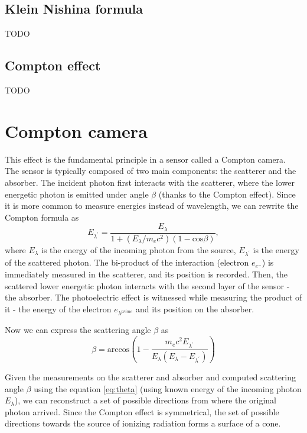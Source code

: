 \subsection{Klein Nishina formula}
TODO

\subsection{Compton effect}
TODO


\section{Compton camera}
This effect is the fundamental principle in a sensor called a Compton camera. 
The sensor is typically composed of two main components: the scatterer and the absorber. 
The incident photon first interacts with the scatterer, where the lower energetic photon is emitted under angle $\beta$ (thanks to the Compton effect). 
Since it is more common to measure energies instead of wavelength, we can rewrite the Compton formula as
\begin{equation}
E_{\lambda^{\prime}} = \frac{E_{\lambda}}{  1 + (E_{\lambda} / m_{e}c^{2}) (1 - \mathrm{cos} \beta)},
\end{equation}
where $E_{\lambda}$ is the energy of the incoming photon from the source, $E_{\lambda^{\prime}}$ is the energy of the scattered photon.  
The bi-product of the interaction (electron $e_{e^{-}}$) is immediately measured in the scatterer, and its position is recorded.
Then, the scattered lower energetic photon interacts with the second layer of the sensor - the absorber. 
The photoelectric effect is witnessed while measuring the product of it - the energy of the electron $e_{\lambda^{prime}}$ and its position on the absorber.

Now we can express the scattering angle $\beta$ as
\begin{equation}
    \beta = \mathrm{arccos} \left (  1-\frac{m_{e}c^{2}E_{\lambda^{\prime}}}{E_{\lambda} (E_{\lambda} - E_{\lambda^{\prime}})} \right )
\end{equation}

Given the measurements on the scatterer and absorber and computed scattering angle $\beta$ using the equation \ref{eq:theta} (using known energy of the incoming photon $E_{\lambda}$), we can reconstruct a set of possible directions from where the original photon arrived. Since the Compton effect is symmetrical, the set of possible directions towards the source of ionizing radiation forms a surface of a cone.



